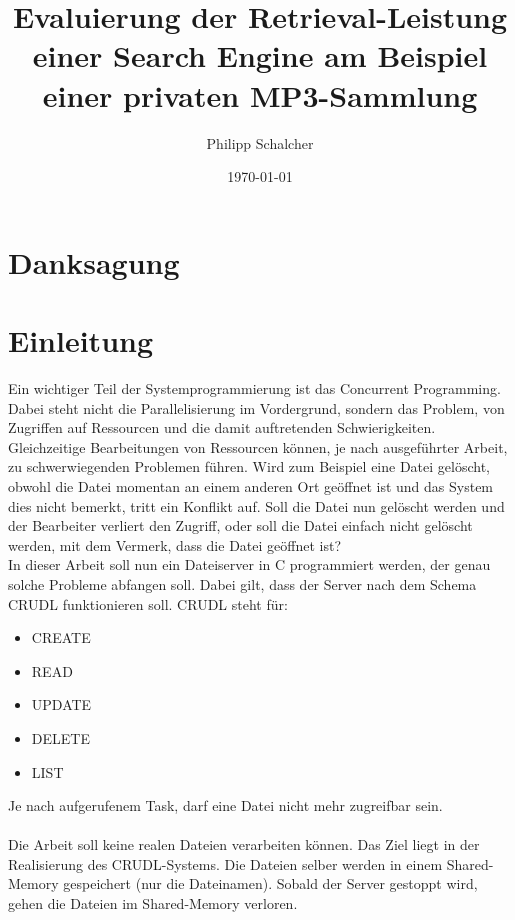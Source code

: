 \documentclass[12pt,a4paper,ngerman]{report}
\author{Philipp Schalcher}
\title{Evaluierung der Retrieval-Leistung einer Search Engine am Beispiel einer privaten MP3-Sammlung}
\date{\today}
\begin{document}

\chapter*{Danksagung}
\tableofcontents
\begin{abstract}

\end{abstract}
\chapter*{Einleitung}
Ein wichtiger Teil der Systemprogrammierung ist das Concurrent Programming. Dabei steht nicht die Parallelisierung im Vordergrund, sondern das Problem, von Zugriffen auf Ressourcen und die damit auftretenden Schwierigkeiten. Gleichzeitige Bearbeitungen von Ressourcen können, je nach ausgeführter Arbeit, zu schwerwiegenden Problemen führen. Wird zum Beispiel eine Datei gelöscht, obwohl die Datei momentan an einem anderen Ort geöffnet ist und das System dies nicht bemerkt, tritt ein Konflikt auf. Soll die Datei nun gelöscht werden und der Bearbeiter verliert den Zugriff, oder soll die Datei einfach nicht gelöscht werden, mit dem Vermerk, dass die Datei geöffnet ist?
\\
In dieser Arbeit soll nun ein Dateiserver in C programmiert werden, der genau solche Probleme abfangen soll. Dabei gilt, dass der Server nach dem Schema CRUDL funktionieren soll. CRUDL steht für:
\begin{itemize}
	\item CREATE
	\item READ
	\item UPDATE
	\item DELETE
	\item LIST
\end{itemize}
Je nach aufgerufenem Task, darf eine Datei nicht mehr zugreifbar sein.
\\
\\
Die Arbeit soll keine realen Dateien verarbeiten können. Das Ziel liegt in der Realisierung des CRUDL-Systems. Die Dateien selber werden in einem Shared-Memory gespeichert (nur die Dateinamen). Sobald der Server gestoppt wird, gehen die Dateien im Shared-Memory verloren.
\end{document}
